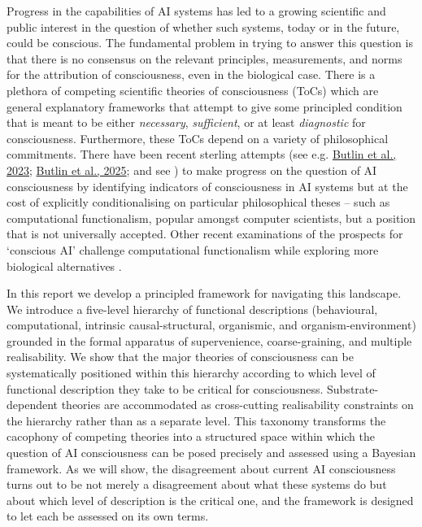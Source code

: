 \documentclass[11pt, a4paper, onecolumn, gdm]{google}
\begin{document}
Progress in the capabilities of AI systems has led to a growing scientific and public interest in the question of whether such systems, today or in the future, could be conscious.
The fundamental problem in trying to answer this question is that there is no consensus on the relevant principles, measurements, and norms for the attribution of consciousness, even in the biological case.
There is a plethora of competing scientific theories of consciousness (ToCs) \citep{seth2022} which are general explanatory frameworks that attempt to give some principled condition that is meant to be either \emph{necessary}, \emph{sufficient}, or at least \emph{diagnostic} for consciousness.
Furthermore, these ToCs depend on a variety of philosophical commitments.
There have been recent sterling attempts (see e.g. \href{https://arxiv.org/abs/2308.08708}{Butlin et al., 2023}; \href{https://www.cell.com/trends/cognitive-sciences/fulltext/S1364-6613(25)00286-4}{Butlin et al., 2025}; and see ) to make progress on the question of AI consciousness by identifying indicators of consciousness in AI systems but at the cost of explicitly conditionalising on particular philosophical theses -- such as computational functionalism, popular amongst computer scientists, but a position that is not universally accepted. 
Other recent examinations of the prospects for `conscious AI' challenge computational functionalism while exploring more biological alternatives \citep[see also commentaries]{seth2024,seth2026stuff}.

In this report we develop a principled framework for navigating this landscape.
We introduce a five-level hierarchy of functional descriptions (behavioural, computational, intrinsic causal-structural, organismic, and organism-environment) grounded in the formal apparatus of supervenience, coarse-graining, and multiple realisability.
We show that the major theories of consciousness can be systematically positioned within this hierarchy according to which level of functional description they take to be critical for consciousness.
Substrate-dependent theories are accommodated as cross-cutting realisability constraints on the hierarchy rather than as a separate level.
This taxonomy transforms the cacophony of competing theories into a structured space within which the question of AI consciousness can be posed precisely and assessed using a Bayesian framework.
As we will show, the disagreement about current AI consciousness turns out to be not merely a disagreement about what these systems do but about which level of description is the critical one, and the framework is designed to let each be assessed on its own terms.
\end{document}
